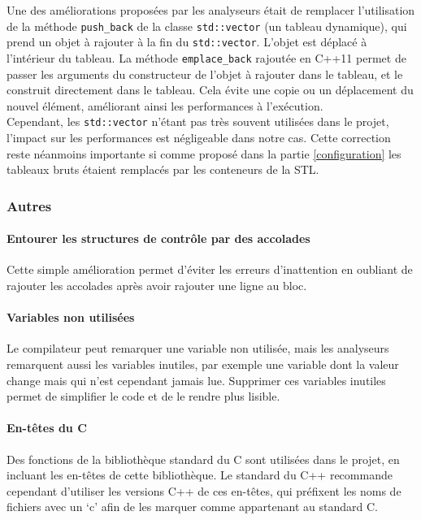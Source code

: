 Une des améliorations proposées par les analyseurs était de remplacer
l'utilisation de la méthode \texttt{push\_back} de la classe
\texttt{std::vector} (un tableau dynamique), qui prend un objet à
rajouter à la fin du \texttt{std::vector}. L'objet est déplacé à
l'intérieur du tableau. La méthode \texttt{emplace\_back} rajoutée en
C++11 permet de passer les arguments du constructeur de l'objet à
rajouter dans le tableau, et le construit directement dans le tableau.
Cela évite une copie ou un déplacement du nouvel élément, améliorant
ainsi les performances à l'exécution.\\
Cependant, les \texttt{std::vector} n'étant pas très souvent utilisées
dans le projet, l'impact sur les performances est négligeable dans notre
cas. Cette correction reste néanmoins importante si comme proposé dans
la partie \ref{configuration} les tableaux bruts étaient remplacés par
les conteneurs de la STL.

\subsubsection{Autres}

\paragraph{Entourer les structures de contrôle par des
accolades}

Cette simple amélioration permet d'éviter les erreurs d'inattention en
oubliant de rajouter les accolades après avoir rajouter une ligne au
bloc.

\paragraph{Variables non utilisées}

Le compilateur peut remarquer une variable non utilisée, mais les
analyseurs remarquent aussi les variables inutiles, par exemple une
variable dont la valeur change mais qui n'est cependant jamais lue.
Supprimer ces variables inutiles permet de simplifier le code et de le
rendre plus lisible.

\paragraph{En-têtes du C}

Des fonctions de la bibliothèque standard du C sont utilisées dans le
projet, en incluant les en-têtes de cette bibliothèque. Le standard du
C++ recommande cependant d'utiliser les versions C++ de ces en-têtes,
qui préfixent les noms de fichiers avec un `c' afin de les marquer comme
appartenant au standard C.
